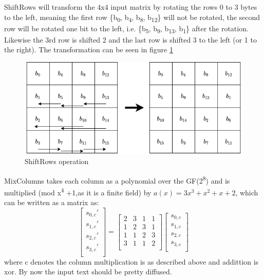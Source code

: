 \documentclass[a4paper]{article}
\begin{document}
ShiftRows will transform the 4x4 input matrix by rotating the rows 0 to 3 bytes to the left, meaning the first row \{b\textsubscript{0}, b\textsubscript{4}, b\textsubscript{8}, b\textsubscript{12}\} will not be rotated, the second row will be rotated one bit to the left, i.e. \{b\textsubscript{5}, b\textsubscript{9}, b\textsubscript{13}, b\textsubscript{1}\} after the rotation. Likewise the 3rd row is shifted 2 and the last row is shifted 3 to the left (or 1 to the right). The transformation can be seen in figure \ref{fig:ShiftRows}


\begin{figure}[htbp]
\centering
\includegraphics[width=.9\linewidth]{./Background/shiftRows.png}
\caption{\label{fig:ShiftRows}ShiftRows operation}
\end{figure}

MixColumns takes each column as a polynomial over the GF(2\textsuperscript{8}) and is multiplied (mod x\textsuperscript{4} +1,as it is a finite field) by \(a(x) = 3x^3 + x^2 + x + 2\), which can be written as a matrix as:
\[
\begin{bmatrix}
 s_{0,c}' \\
 s_{1,c}' \\
 s_{2,c}' \\
 s_{3,c}' \\
\end{bmatrix}=
\begin{bmatrix}
 2 & 3 & 1 & 1 \\
 1 & 2 & 3 & 1 \\
 1 & 1 & 2 & 3 \\
 3 & 1 & 1 & 2 \\
\end{bmatrix}
\begin{bmatrix}
 s_{0,c} \\
 s_{1,c} \\
 s_{2,c} \\
 s_{3,c} \\
\end{bmatrix}
\]
where c denotes the column multiplication is as described above and addittion is xor. By now the input text should be pretty diffused.
\end{document}
